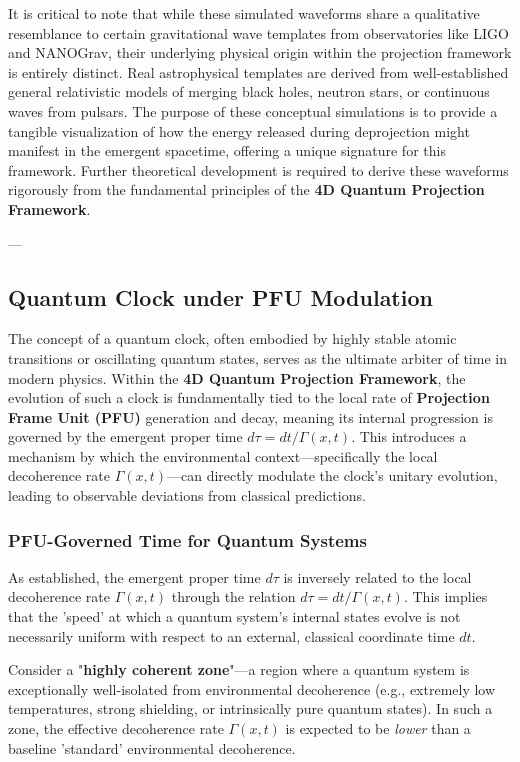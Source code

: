 \documentclass[12pt,a4paper]{article}
\numberwithin{equation}{section}
\begin{document}
It is critical to note that while these simulated waveforms share a qualitative resemblance to certain gravitational wave templates from observatories like LIGO and NANOGrav, their underlying physical origin within the projection framework is entirely distinct. Real astrophysical templates are derived from well-established general relativistic models of merging black holes, neutron stars, or continuous waves from pulsars. The purpose of these conceptual simulations is to provide a tangible visualization of how the energy released during deprojection might manifest in the emergent spacetime, offering a unique signature for this framework. Further theoretical development is required to derive these waveforms rigorously from the fundamental principles of the \textbf{4D Quantum Projection Framework}.

---

\subsection{Quantum Clock under PFU Modulation}
The concept of a quantum clock, often embodied by highly stable atomic transitions or oscillating quantum states, serves as the ultimate arbiter of time in modern physics. Within the \textbf{4D Quantum Projection Framework}, the evolution of such a clock is fundamentally tied to the local rate of \textbf{Projection Frame Unit (PFU)} generation and decay, meaning its internal progression is governed by the emergent proper time $d\tau = dt / \Gamma(x, t)$. This introduces a mechanism by which the environmental context—specifically the local decoherence rate $\Gamma(x, t)$—can directly modulate the clock's unitary evolution, leading to observable deviations from classical predictions.

\subsubsection{PFU-Governed Time for Quantum Systems}
As established, the emergent proper time $d\tau$ is inversely related to the local decoherence rate $\Gamma(x, t)$ through the relation $d\tau = dt / \Gamma(x, t)$. This implies that the 'speed' at which a quantum system's internal states evolve is not necessarily uniform with respect to an external, classical coordinate time $dt$.

Consider a "\textbf{highly coherent zone}"—a region where a quantum system is exceptionally well-isolated from environmental decoherence (e.g., extremely low temperatures, strong shielding, or intrinsically pure quantum states). In such a zone, the effective decoherence rate $\Gamma(x, t)$ is expected to be \textit{lower} than a baseline 'standard' environmental decoherence.
\end{document}
